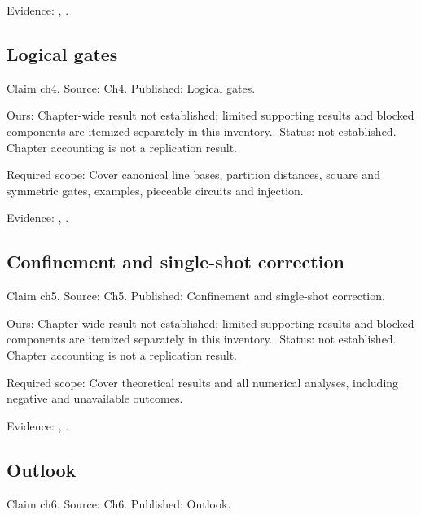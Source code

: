 Evidence: \href{https://github.com/alectionary/vibe-math/blob/master/formalization/quintavalle-hgp/sources/browser-extraction.txt}{}, \href{https://github.com/alectionary/vibe-math/blob/master/formalization/quintavalle-hgp/availability.md}{}.
\subsection{Logical gates}\label{claim:ch4}
Claim ch4. Source: Ch4. Published: Logical gates.

Ours: Chapter-wide result not established; limited supporting results and blocked components are itemized separately in this inventory.. Status: not established. Chapter accounting is not a replication result.

Required scope: Cover canonical line bases, partition distances, square and symmetric gates, examples, pieceable circuits and injection.

Evidence: \href{https://github.com/alectionary/vibe-math/blob/master/formalization/quintavalle-hgp/sources/browser-extraction.txt}{}, \href{https://github.com/alectionary/vibe-math/blob/master/formalization/quintavalle-hgp/availability.md}{}.
\subsection{Confinement and single-shot correction}\label{claim:ch5}
Claim ch5. Source: Ch5. Published: Confinement and single-shot correction.

Ours: Chapter-wide result not established; limited supporting results and blocked components are itemized separately in this inventory.. Status: not established. Chapter accounting is not a replication result.

Required scope: Cover theoretical results and all numerical analyses, including negative and unavailable outcomes.

Evidence: \href{https://github.com/alectionary/vibe-math/blob/master/formalization/quintavalle-hgp/sources/browser-extraction.txt}{}, \href{https://github.com/alectionary/vibe-math/blob/master/formalization/quintavalle-hgp/availability.md}{}.
\subsection{Outlook}\label{claim:ch6}
Claim ch6. Source: Ch6. Published: Outlook.

